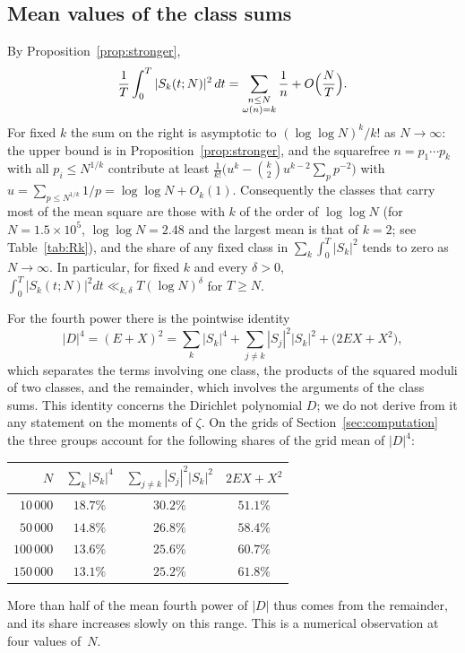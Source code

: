 \documentclass[11pt]{amsart}
\theoremstyle{definition}
\theoremstyle{remark}
\begin{document}
\subsection{Mean values of the class sums}
\label{subsec:moments}
By Proposition~\ref{prop:stronger},
\[
  \frac1T\int_0^T|S_k(t;N)|^2\,dt
  =\sum_{\substack{n\le N\\ \omega(n)=k}}\frac1n+O\Bigl(\frac NT\Bigr).
\]
For fixed $k$ the sum on the right is asymptotic to
$(\log\log N)^k/k!$ as $N\to\infty$: the upper bound is in
Proposition~\ref{prop:stronger}, and the squarefree $n=p_1\cdots p_k$ with
all $p_i\le N^{1/k}$ contribute at least
$\frac1{k!}\bigl(u^k-\binom k2u^{k-2}\sum_pp^{-2}\bigr)$ with
$u=\sum_{p\le N^{1/k}}1/p=\log\log N+O_k(1)$.  Consequently the classes
that carry most of the mean square are those with $k$ of the order of
$\log\log N$ (for $N=1.5\times10^5$, $\log\log N=2.48$ and the largest
mean is that of $k=2$; see Table~\ref{tab:Rk}), and the share of any fixed
class in $\sum_k\int_0^T|S_k|^2$ tends to zero as $N\to\infty$.  In
particular, for fixed $k$ and every $\delta>0$,
$\int_0^T|S_k(t;N)|^2dt\ll_{k,\delta}T(\log N)^{\delta}$ for $T\ge N$.

For the fourth power there is the pointwise identity
\[
  |D|^4=(E+X)^2=\sum_k|S_k|^4+\sum_{j\ne k}|S_j|^2|S_k|^2+\bigl(2EX+X^2\bigr),
\]
which separates the terms involving one class, the products of the
squared moduli of two classes, and the remainder, which involves the
arguments of the class sums.  This identity concerns the Dirichlet
polynomial $D$; we do not derive from it any statement on the moments of
$\zeta$.
On the grids of Section~\ref{sec:computation} the three groups account for
the following shares of the grid mean of $|D|^4$:
\begin{center}
\begin{tabular}{rccc}
\toprule
$N$ & $\sum_k|S_k|^4$ & $\sum_{j\ne k}|S_j|^2|S_k|^2$ & $2EX+X^2$ \\
\midrule
$10\,000$  & $18.7\%$ & $30.2\%$ & $51.1\%$ \\
$50\,000$  & $14.8\%$ & $26.8\%$ & $58.4\%$ \\
$100\,000$ & $13.6\%$ & $25.6\%$ & $60.7\%$ \\
$150\,000$ & $13.1\%$ & $25.2\%$ & $61.8\%$ \\
\bottomrule
\end{tabular}
\end{center}
More than half of the mean fourth power of $|D|$ thus comes from the
remainder, and its share increases slowly on this range.  This is a
numerical observation at four values of~$N$.
\end{document}

